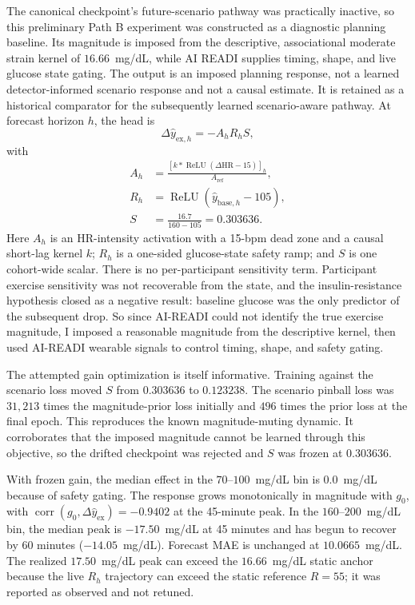 The canonical checkpoint's future-scenario pathway was practically inactive,
so this preliminary Path B experiment was constructed as a diagnostic planning
baseline. Its magnitude is imposed from the descriptive, associational
moderate strain kernel of $16.66$~mg/dL, while AI READI supplies timing, shape,
and live glucose state gating. The output is an imposed planning response,
not a learned detector-informed scenario response and not a causal estimate.
It is retained as a historical comparator for the subsequently learned
scenario-aware pathway. At forecast horizon $h$, the head is
\begin{equation}
  \Delta\hat y_{\mathrm{ex},h}=-A_hR_hS,
  \label{eq:exercise_head}
\end{equation}
with
\begin{align}
  A_h &= \frac{\left[k * \operatorname{ReLU}
    (\Delta\mathrm{HR}-15)\right]_h}{A_{\mathrm{ref}}},
    \label{eq:exercise_activation}\\
  R_h &= \operatorname{ReLU}\left(\hat y_{\mathrm{base},h}-105\right),
    \label{eq:exercise_ramp}\\
  S &= \frac{16.7}{160-105}=0.303636.
    \label{eq:exercise_gain}
\end{align}
Here $A_h$ is an HR-intensity activation with a 15-bpm dead zone and a
causal short-lag kernel $k$; $R_h$ is a one-sided glucose-state safety ramp;
and $S$ is one cohort-wide scalar. There is no per-participant sensitivity
term. Participant exercise sensitivity was not recoverable from the state,
and the insulin-resistance hypothesis closed as a negative result: baseline
glucose was the only predictor of the subsequent drop. So since AI-READI could not identify the true exercise magnitude, I imposed a reasonable magnitude from the descriptive kernel, then used AI-READI wearable signals to control timing, shape, and safety gating.

The attempted gain optimization is itself informative. Training against the
scenario loss moved $S$ from $0.303636$ to $0.123238$. The scenario pinball
loss was $31{,}213$ times the magnitude-prior loss initially and $496$ times
the prior loss at the final epoch. This reproduces the known magnitude-muting
dynamic. It corroborates that the imposed magnitude cannot be learned through
this objective, so the drifted checkpoint was rejected and $S$ was frozen at
$0.303636$.

With frozen gain, the median effect in the $70$--$100$~mg/dL bin is
$0.0$~mg/dL because of safety gating. The response grows monotonically in
magnitude with $g_0$, with
$\operatorname{corr}(g_0,\Delta\hat y_{\mathrm{ex}})=-0.9402$ at the
45-minute peak. In the $160$--$200$~mg/dL bin, the median peak is
$-17.50$~mg/dL at 45 minutes and has begun to recover by 60 minutes
($-14.05$~mg/dL). Forecast MAE is unchanged at $10.0665$~mg/dL. The realized $17.50$~mg/dL peak can exceed
the $16.66$~mg/dL static anchor because the live $R_h$ trajectory can exceed
the static reference $R=55$; it was reported as observed and not retuned.

